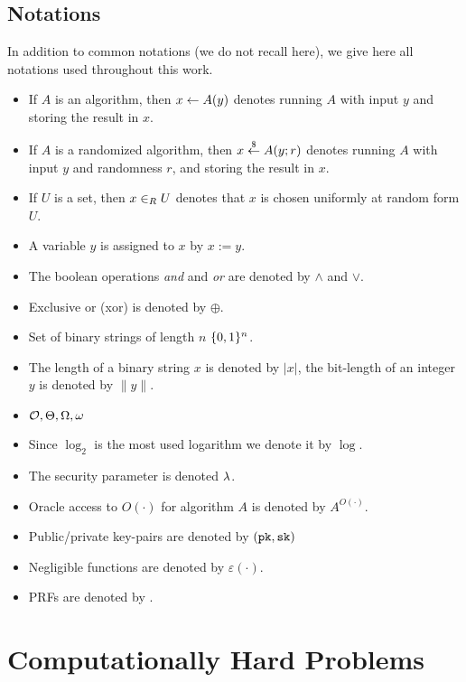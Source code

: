 \subsection{Notations}
In addition to common notations (we do not recall here), we give here all notations used throughout this work.
\begin{itemize}
	\item If $A$ is an algorithm, then $x\gets A(y)$ denotes running $A$ with input $y$ and storing the result in $x$.
	\item If $A$ is a randomized algorithm, then $x\stackrel{\$}{\gets} A(y;r)$ denotes running $A$ with input $y$ and randomness $r$, and storing the result in $x$.
	\item If $U$ is a set, then $x\in_R U$ denotes that $x$ is chosen uniformly at random form $U$.
	\item A variable $y$ is assigned to $x$ by $x:=y$.
	\item The boolean operations \emph{and} and \emph{or} are denoted by $\wedge$ and $\vee$.
	\item Exclusive or (xor) is denoted by $\oplus$.
	\item Set of binary strings of length $n$ $\{0,1\}^n$.
	\item The length of a binary string $x$ is denoted by $|x|$, the bit-length of an integer $y$ is denoted by $\|y\|$.
	\item $\mathcal{O},\Theta,\Omega,\omega$
	\item Since $\log_2$ is the most used logarithm we denote it by $\log$.
	\item The security parameter is denoted $\lambda$.
	\item Oracle access to $O(\cdot)$ for algorithm $A$ is denoted by $A^{O(\cdot)}$.
	\item Public/private key-pairs are denoted by $(\mathtt{pk},\mathtt{sk})$
	\item Negligible functions are denoted by $\varepsilon(\cdot)$.
	\item \aclp{PRF} are denoted by \PRF.
\end{itemize}

\section{Computationally Hard Problems}


